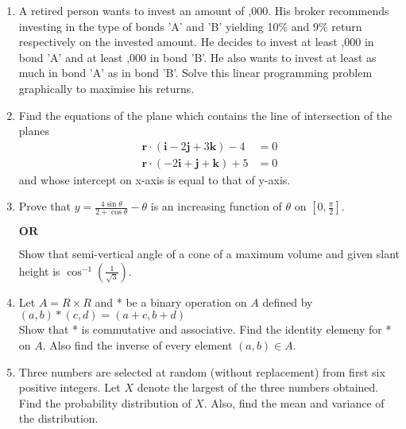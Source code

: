 \documentclass[12pt,-letter paper]{article}
\providecommand{\brak}[1]{\ensuremath{\left(#1\right)}}
\theoremstyle{remark}
\let\vec\mathbf
\begin{document}
\begin{enumerate}
\item A retired person wants to invest an amount of ,000. His broker recommends investing in the type of bonds 'A' and 'B' yielding 10\% and 9\% return respectively on the invested amount. He decides to invest at least ,000 in bond 'A' and at least ,000 in bond 'B'. He also wants to invest at least as much in bond 'A' as in bond 'B'. Solve this linear programming problem graphically to maximise his returns.\\

\item Find the equations of the plane which contains the line of intersection of the planes
\begin{align*}\vec{r}\cdot\brak{\vec{i} -2\vec{j} + 3\vec{k}}-4&=0 \\ \vec{r}\cdot\brak{-2\vec{i} + \vec{j} + \vec{k}}+5&=0 
\end{align*}
and whose intercept on x-axis is equal to that of y-axis.\\

\item Prove that $y = \frac{4\sin\theta}{2+\cos\theta} - \theta$ is an increasing function of $\theta$ on $\left [0, \frac{\pi}{2}\right ]$.
\begin{center} $\vec{OR}$ \\ \end{center}
Show that semi-vertical angle of a cone of a maximum volume and given slant height is $\cos^{-1}\brak{\frac{1}{\sqrt{3}}}$.

\item Let $A=R\times R$ and * be a binary operation on $A$ defined by $(a,b)*(c,d) = (a+c,b+d)$\\
Show that * is commutative and associative. Find the identity elemeny for * on $A$. Also find the inverse of every element $(a, b) \in A$.\\

\item Three numbers are selected at random (without replacement) from first six positive integers. Let $X$ denote the largest of the three numbers obtained. Find the probability distribution of $X$. Also, find the mean and variance of the distribution.

\end{enumerate}
\end{document}
